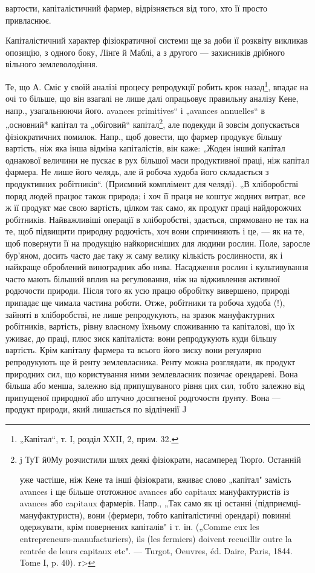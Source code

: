 вартости, капіталістичний фармер, відрізняється від того, хто її просто
привласнює.

Капіталістичний характер фізіократичної системи ще за доби її розквіту
викликав опозицію, з одного боку, Лінґе й Маблі, а з другого —
захисників дрібного вільного землеволодіння.

Те, що А. Сміс у своїй аналізі процесу репродукції робить крок
назад\footnote{
„Капітал“, т. І, розділ XXII, 2, прим. 32.
}, впадає на очі то більше, що він взагалі не лише далі опрацьовує
правильну аналізу Кене, напр., узагальнюючи його. avances primitives“
і „avances annuelles“ в „основний* капітал та „обіговий“
капітал\footnote{
j ТуТ й0Му розчистили шлях деякі фізіократи, насамперед Тюрґо. Останній

уже частіше, ніж Кене та інші фізіократи, вживає слово „капітал" замість avances
і ще більше ототожнює avances або capitaux мануфактуристів із avances або
capitaux фармерів. Напр., „Так само як ці останні (підприємці-мануфактуристн),
вони (фермери, тобто капіталістичні орендарі) повинні одержувати, крім повернених
капіталів" і т. ін. („Comme eux les entrepreneurs-manufacturiers), ils (les fermiers)
doivent recueillir outre la rentrée de leurs capitaux etc". — Turgot, Oeuvres, éd.
Daire, Paris, 1844. Tome I, p. 40). r>
}, але подекуди й зовсім допускається фізіократичних помилок.
Напр., щоб довести, що фармер продукує більшу вартість, ніж яка інша
відміна капіталістів, він каже: „Жоден інший капітал однакової величини
не пускає в рух більшої маси продуктивної праці, ніж капітал фармера.
Не лише його челядь, але й робоча худоба його складається з продуктивних
робітників“. (Приємний комплімент для челяді). „В хліборобстві
поряд людей працює також природа; і хоч її праця не коштує
жодних витрат, все ж її продукт має свою вартість, цілком
так само, як продукт праці найдорожчих робітників.
Найважливіші операції в хліборобстві, здається, спрямовано не так на те,
щоб підвищити природну родючість, хоч вони спричиняють і це, — як
на те, щоб повернути її на продукцію найкорисніших для людини рослин.
Поле, заросле бур’яном, досить часто дає таку ж саму велику
кількість рослинности, як і найкраще оброблений виноградник або
нива. Насадження рослин і культивування часто мають більший вплив на
регулювання, ніж на відживлення активної родючости природи. Після
того як усю працю обробітку вивершено, природі припадає ще чимала
частина роботи. Отже, робітники та робоча худоба (!), зайняті в хліборобстві,
не лише репродукують, на зразок мануфактурних робітників,
вартість, рівну власному їхньому споживанню та капіталові, що їх уживає,
до праці, плюс зиск капіталіста: вони репродукують куди більшу вартість.
Крім капіталу фармера та всього його зиску вони регулярно репродукують
ще й ренту землевласника. Ренту можна розглядати, як продукт
природних сил, що користування ними землевласник позичає орендареві.
Вона більша або менша, залежно від припушуваного рівня цих сил,
тобто залежно від припущеної природної або штучно досягненої родгочостн
ґрунту. Вона — продукт природи, який лишається по відліченії J